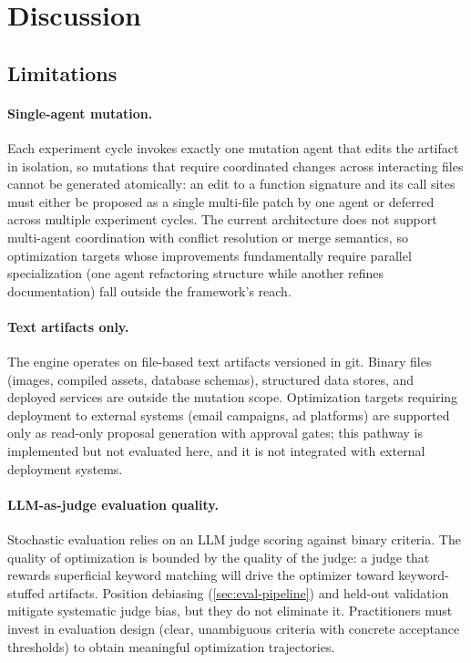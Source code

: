 \section{Discussion}
\label{sec:discussion}

\subsection{Limitations}
\label{sec:limitations}

\paragraph{Single-agent mutation.}
Each experiment cycle invokes exactly one mutation agent that edits the artifact in isolation, so mutations that require coordinated changes across interacting files cannot be generated atomically: an edit to a function signature and its call sites must either be proposed as a single multi-file patch by one agent or deferred across multiple experiment cycles.
The current architecture does not support multi-agent coordination with conflict resolution or merge semantics, so optimization targets whose improvements fundamentally require parallel specialization (one agent refactoring structure while another refines documentation) fall outside the framework's reach.

\paragraph{Text artifacts only.}
The engine operates on file-based text artifacts versioned in git.
Binary files (images, compiled assets, database schemas), structured data stores, and deployed services are outside the mutation scope.
Optimization targets requiring deployment to external systems (email campaigns, ad platforms) are supported only as read-only proposal generation with approval gates; this pathway is implemented but not evaluated here, and it is not integrated with external deployment systems.

\paragraph{LLM-as-judge evaluation quality.}
Stochastic evaluation relies on an LLM judge scoring against binary criteria.
The quality of optimization is bounded by the quality of the judge: a judge that rewards superficial keyword matching will drive the optimizer toward keyword-stuffed artifacts.
Position debiasing (\cref{sec:eval-pipeline}) and held-out validation mitigate systematic judge bias, but they do not eliminate it.
Practitioners must invest in evaluation design (clear, unambiguous criteria with concrete acceptance thresholds) to obtain meaningful optimization trajectories.

